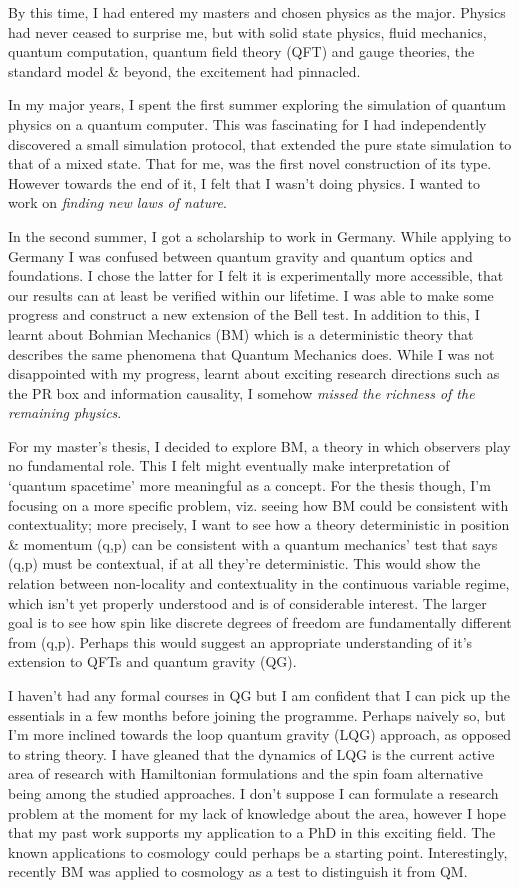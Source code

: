 By this time, I had entered my masters and chosen physics as the major. Physics had never ceased to surprise me, but with solid state physics, fluid mechanics, quantum computation, quantum field theory (QFT) and gauge theories, the standard model \& beyond, the excitement had pinnacled. 


In my major years, I spent the first summer exploring the simulation of quantum physics  on a quantum computer. This was fascinating for I had independently discovered a small simulation protocol, that extended the pure state simulation to that of a mixed state. That for me, was the first novel construction of its type. However towards the end of it, I felt that I wasn't doing physics. I wanted to work on \emph{finding new laws of nature}.


In the second summer, I got a scholarship to work in Germany. While applying to Germany I was confused between quantum gravity and quantum optics and foundations. I chose the latter for I felt it is experimentally more accessible, that our results can at least be verified within our lifetime. I was able to make some progress and construct a new extension of the Bell test. In addition to this, I learnt about Bohmian Mechanics (BM) which is a deterministic theory that describes the same phenomena that Quantum Mechanics does. While I was not disappointed with my progress, learnt about exciting research directions such as the PR box and information causality, I somehow \emph{missed the richness of the remaining physics}.


For my master's thesis, I decided to explore BM, a theory in which observers play no fundamental role. This I felt might eventually make interpretation of `quantum spacetime' more meaningful as a concept. For the thesis though, I'm focusing on a more specific problem, viz. seeing how BM could be consistent with contextuality; more precisely, I want to see how a theory deterministic in position \& momentum (q,p) can be consistent with a quantum mechanics' test that says (q,p) must be contextual, if at all they're deterministic. This would show the relation between non-locality and contextuality in the continuous variable regime, which isn't yet properly understood and is of considerable interest. The larger goal is to see how spin like discrete degrees of freedom are fundamentally different from (q,p). Perhaps this would suggest an appropriate understanding of it's extension to QFTs and quantum gravity (QG).


I haven't had any formal courses in QG but I am confident that I can pick up the essentials in a few months before joining the programme. Perhaps naively so, but I'm more inclined towards the loop quantum gravity (LQG) approach, as opposed to string theory. I have gleaned that the dynamics of LQG is the current active area of research with Hamiltonian formulations and the spin foam alternative being among the studied approaches. I don't suppose I can formulate a research problem at the moment for my lack of knowledge about the area, however I hope that my past work supports my application to a PhD in this exciting field. The known applications to cosmology could perhaps be a starting point. Interestingly, recently BM was applied to cosmology as a test to distinguish it from QM.


